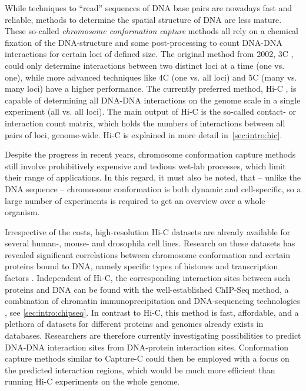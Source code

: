 While techniques to ``read'' sequences of DNA base pairs are nowadays fast and reliable, 
methods to determine the spatial structure of DNA are less mature.
These so-called \emph{chromosome conformation capture} methods all rely on a chemical fixation 
of the DNA-structure and some post-processing to count DNA-DNA interactions for certain loci of defined size. 
The original method from 2002, 3C \cite{Dekker2002}, could only determine interactions 
between two distinct loci at a time (one vs. one), while more advanced techniques like
4C \cite{Simonis2006} (one vs. all loci) and 5C \cite{Dostie2006} (many vs. many loci) 
 have a higher performance.
The currently preferred method, Hi-C \cite{LiebermanAiden2009, Berkum2010},
is capable of determining all DNA-DNA interactions on the genome scale in a single experiment 
(all vs. all loci). 
The main output of Hi-C is the so-called contact- or interaction count matrix, 
which holds the numbers of interactions between all pairs of loci, genome-wide.
Hi-C is explained in more detail in \,\autoref{sec:intro:hic}.

Despite the progress in recent years, chromosome conformation capture methods still involve prohibitively expensive and 
tedious wet-lab processes, which limit their range of applications. 
In this regard, it must also be noted, that -- unlike the DNA sequence -- 
chromosome conformation is both dynamic and cell-specific, 
so a large number of experiments is required to get an overview over a whole organism.

Irrespective of the costs, high-resolution Hi-C datasets are already available for several 
human-, mouse- and drosophila cell lines.
Research on these datasets has revealed significant correlations between 
chromosome conformation and certain proteins bound to DNA, namely specific types of histones 
and transcription factors \cite{Bonev2016, Rao2014}.
Independent of Hi-C, the corresponding interaction sites between such proteins and DNA can be found with the well-established ChIP-Seq method,
a combination of chromatin immunoprecipitation and DNA-sequencing technologies \cite{Johnson2007, Robertson2007}, see
\autoref{sec:intro:chipseq}. 
In contrast to Hi-C, this method is fast, affordable, and a plethora of datasets for different proteins and genomes
already exists in databases.
Researchers are therefore currently investigating possibilities to predict DNA-DNA interaction sites 
from DNA-protein interaction sites. Conformation capture methods similar to Capture-C \cite{Hughes2014} could then be employed 
with a focus on the predicted interaction regions, which would be much more efficient than running Hi-C experiments on the whole genome.

